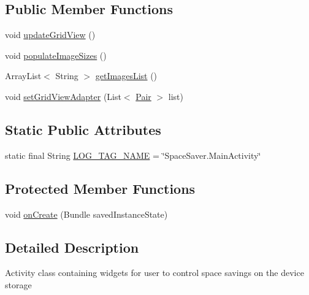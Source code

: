 \subsection*{Public Member Functions}
\begin{DoxyCompactItemize}
\item 
void \hyperlink{classcourse_1_1examples_1_1spacesaver_1_1_main_activity_a481dd05c78e456ac48a34a89ac0e3671}{update\+Grid\+View} ()
\item 
void \hyperlink{classcourse_1_1examples_1_1spacesaver_1_1_main_activity_ac490d48da8ace7738b01cff2e28aee1d}{populate\+Image\+Sizes} ()
\item 
Array\+List$<$ String $>$ \hyperlink{classcourse_1_1examples_1_1spacesaver_1_1_main_activity_a1ce9342bbb09b808ddafc08b9ba3fbf6}{get\+Images\+List} ()
\item 
void \hyperlink{classcourse_1_1examples_1_1spacesaver_1_1_main_activity_a53620ebc69e8c3b33626ede6c952cc6c}{set\+Grid\+View\+Adapter} (List$<$ \hyperlink{classcourse_1_1examples_1_1spacesaver_1_1_pair}{Pair} $>$ list)
\end{DoxyCompactItemize}
\subsection*{Static Public Attributes}
\begin{DoxyCompactItemize}
\item 
static final String \hyperlink{classcourse_1_1examples_1_1spacesaver_1_1_main_activity_a3151df70b338956cfe81e014cfba50fc}{L\+O\+G\+\_\+\+T\+A\+G\+\_\+\+N\+A\+M\+E} = \char`\"{}Space\+Saver.\+Main\+Activity\char`\"{}
\end{DoxyCompactItemize}
\subsection*{Protected Member Functions}
\begin{DoxyCompactItemize}
\item 
void \hyperlink{classcourse_1_1examples_1_1spacesaver_1_1_main_activity_a03e5171f1ff658442936a03ef4caf7a3}{on\+Create} (Bundle saved\+Instance\+State)
\end{DoxyCompactItemize}


\subsection{Detailed Description}
Activity class containing widgets for user to control space savings on the device storage 

